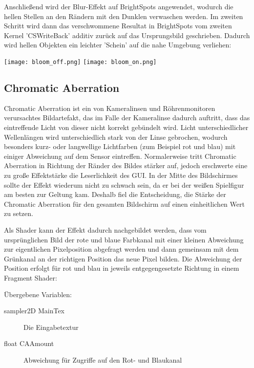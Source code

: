 Anschlie{\ss}end wird der Blur-Effekt auf BrightSpots angewendet, wodurch die hellen Stellen an den Rändern mit den Dunklen verwaschen werden. Im zweiten Schritt wird dann das verschwommene Resultat in BrightSpots vom zweiten Kernel 'CSWriteBack' additiv zurück auf das Ursprungsbild geschrieben. Dadurch wird hellen Objekten ein leichter 'Schein' auf die nahe Umgebung verliehen:

\captionsetup{type=figure}
\texttt{[image: bloom\_off.png]}
\texttt{[image: bloom\_on.png]}




\subsection{Chromatic Aberration}
\label{label:chromatic aberration}

Chromatic Aberration ist ein von Kameralinsen und Röhrenmonitoren verursachtes Bildartefakt, das im Falle der Kameralinse dadurch auftritt, dass das eintreffende Licht von dieser nicht korrekt gebündelt wird. Licht unterschiedlicher Wellenlängen wird unterschiedlich stark von der Linse gebrochen, wodurch besonders kurz- oder langwellige Lichtfarben (zum Beispiel rot und blau) mit einiger Abweichung auf dem Sensor eintreffen. Normalerweise tritt Chromatic Aberration in Richtung der Ränder des Bildes stärker auf, jedoch erschwerte eine zu gro{\ss}e Effektstärke die Leserlichkeit des GUI. In der Mitte des Bildschirmes sollte der Effekt wiederum nicht zu schwach sein, da er bei der wei{\ss}en Spielfigur am besten zur Geltung kam. Deshalb fiel die Entscheidung, die Stärke der Chromatic Aberration für den gesamten Bildschirm auf einen einheitlichen Wert zu setzen.

Als Shader kann der Effekt dadurch nachgebildet werden, dass vom ursprünglichen Bild der rote und blaue Farbkanal mit einer kleinen Abweichung zur eigentlichen Pixelposition abgefragt werden und dann gemeinsam mit dem Grünkanal an der richtigen Position das neue Pixel bilden. Die Abweichung der Position erfolgt für rot und blau in jeweils entgegengesetzte Richtung in einem Fragment Shader:

Übergebene Variablen:
\begin{description}
\item[sampler2D MainTex] Die Eingabetextur
\item[float CAAmount] Abweichung für Zugriffe auf den Rot- und Blaukanal
\end{description}


